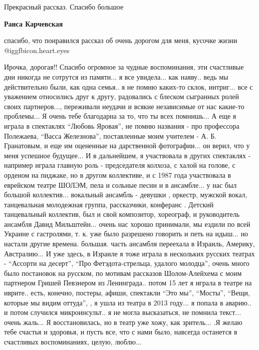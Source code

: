 \begin{itemize}

Прекрасный рассказ. Спасибо большое

\textbf{Раиса Карчевская} 

спасибо, что понравился рассказ об очень дорогом для меня, кусочке жизни
@igg{fbicon.heart.eyes} 


Ирочка, дорогая!! Спасибо огромное за чудные воспоминания, эти счастливые дни
никогда не сотрутся из памяти... я все увидела... как наяву.. ведь мы
действительно были, как одна семья.. я не помню каких-то склок, интриг... все с
уважением относились друг к другу, радовались с блеском сыгранных ролей своих
партнеров..., переживали неудачи и всякие независимые от нас какие-то
проблемы... Я очень тебе благодарна за то, что ты всех помнишь... А еще я играла
в спектаклях \enquote{Любовь Яровая}, не помню названия - про профессора Полежаева,
\enquote{Васса Железнова}, поставленные моим учителем - А. Б. Гранатовым, и еще им
оцененные на дарственной фотографии... он верил, что у меня успешное будущее... И
в дальнейшем, я участвовала в других спектаклях - например играла главную роль -
председателя колхоза, с халой на голове, с орденом на пиджаке, но в другом
коллективе, и с 1987 года участвовала в еврейском театре ШОЛЭМ, пела и сольные
песни и в ансамбле... у нас был большой коллектив... вокальный ансамбль - девушки
, оркестр, мужской вокал, танцевальная молодежная группа, рассказчики,
конферанс . Детский танцевальный коллектив, был и свой композитор, хореограф, и
руководитель ансамбля Давид Мильштейн... очень нас хорошо принимали, мы ездили
по всей Украине с гастролями, т. к. уже было разрешено говорить и петь на
идыш... но настали другие времена. большая. часть ансамбля переехала в Израиль,
Америку, Австралию... И уже здесь, в Израиле я тоже играла в нескольких русских
театрах - \enquote{Ассорти на десерт}, \enquote{Про Фетэдота-стрельца, удалого молодца}, очень
много было постановок на русском, по мотивам рассказов Шолом-Алейхема с моим
партнером Гришей Певзнером из Ленинграда.. потом 15 лет я играла в театре на
иврите.. есть, конечно, постеры, афиши, спектакли \enquote{Это мы}, \enquote{Мосты}, \enquote{Вещи,
которые мы видим оттуда}, , я ушла из театра в 2013 году... я попала в аварию.. и
потом случился микроинсульт.. я не могла высказаться, не помнила текст... очень
жаль... Я восстановилась, но в театр уже хожу, как зритель... .Я желаю тебе
счастья и здоровья, и пусть все, что с нами было, навсегда останется в
счастливых воспоминаниях, целую, люблю...


\end{itemize}
